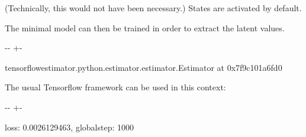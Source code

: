 \documentclass[letterpaper,10pt,english]{sphinxmanual}
\newlength\nbsphinxcodecellspacing
\begin{document}
(Technically, this would not have been necessary.) States are activated by default.

The minimal model can then be trained in order to extract the latent values.

{
\begin{sphinxVerbatim}[commandchars=\\\{\}]
\llap{\color{nbsphinxin}[5]:\,\hspace{\fboxrule}\hspace{\fboxsep}}
\end{sphinxVerbatim}
}

{

\kern-\sphinxverbatimsmallskipamount\kern-\baselineskip
\kern+\FrameHeightAdjust\kern-\fboxrule
\vspace{\nbsphinxcodecellspacing}

\begin{sphinxVerbatim}[commandchars=\\\{\}]
\llap{\color{nbsphinxout}[5]:\,\hspace{\fboxrule}\hspace{\fboxsep}}\PYGZlt{}tensorflow\PYGZus{}estimator.python.estimator.estimator.Estimator at 0x7f9c101a6fd0\PYGZgt{}
\end{sphinxVerbatim}
}

The usual Tensorflow framework can be used in this context:

{
\begin{sphinxVerbatim}[commandchars=\\\{\}]
\llap{\color{nbsphinxin}[6]:\,\hspace{\fboxrule}\hspace{\fboxsep}}
\end{sphinxVerbatim}
}

{

\kern-\sphinxverbatimsmallskipamount\kern-\baselineskip
\kern+\FrameHeightAdjust\kern-\fboxrule
\vspace{\nbsphinxcodecellspacing}

\begin{sphinxVerbatim}[commandchars=\\\{\}]
\llap{\color{nbsphinxout}[6]:\,\hspace{\fboxrule}\hspace{\fboxsep}}\PYGZob{}\PYGZsq{}loss\PYGZsq{}: 0.0026129463, \PYGZsq{}global\PYGZus{}step\PYGZsq{}: 1000\PYGZcb{}
\end{sphinxVerbatim}
}
\end{document}
